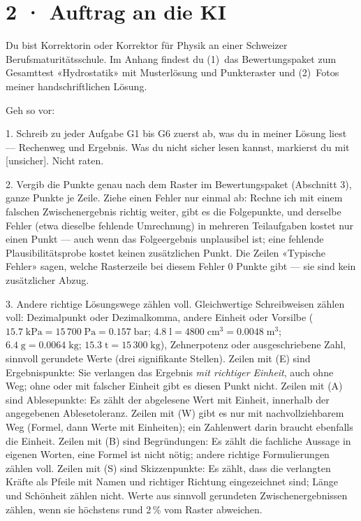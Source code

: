 \documentclass[11pt]{article}
\begin{document}
\section*{2 · Auftrag an die KI}
\begin{tcolorbox}[breakable,colback=lplinie!25,colframe=lplinie,boxrule=0.5pt,arc=1mm,fontupper=\small]
Du bist Korrektorin oder Korrektor für Physik an einer Schweizer Berufsmaturitätsschule. Im Anhang findest du (1)~das Bewertungspaket zum Gesamttest «Hydrostatik» mit Musterlösung und Punkteraster und (2)~Fotos meiner handschriftlichen Lösung.\par\medskip
Geh so vor:\par
1. Schreib zu jeder Aufgabe G1 bis G6 zuerst ab, was du in meiner Lösung liest — Rechenweg und Ergebnis. Was du nicht sicher lesen kannst, markierst du mit [unsicher]. Nicht raten.\par
2. Vergib die Punkte genau nach dem Raster im Bewertungspaket (Abschnitt 3), ganze Punkte je Zeile. Ziehe einen Fehler nur einmal ab: Rechne ich mit einem falschen Zwischenergebnis richtig weiter, gibt es die Folgepunkte, und derselbe Fehler (etwa dieselbe fehlende Umrechnung) in mehreren Teilaufgaben kostet nur einen Punkt — auch wenn das Folgeergebnis unplausibel ist; eine fehlende Plausibilitätsprobe kostet keinen zusätzlichen Punkt. Die Zeilen «Typische Fehler» sagen, welche Rasterzeile bei diesem Fehler 0 Punkte gibt — sie sind kein zusätzlicher Abzug.\par
3. Andere richtige Lösungswege zählen voll. Gleichwertige Schreibweisen zählen voll: Dezimalpunkt oder Dezimalkomma, andere Einheit oder Vorsilbe ($15.7\;\text{kPa} = 15\,700\;\text{Pa} = 0.157\;\text{bar}$; $4.8\;\text{l} = 4800\;\text{cm}^3 = 0.0048\;\text{m}^3$; $6.4\;\text{g} = 0.0064\;\text{kg}$; $15.3\;\text{t} = 15\,300\;\text{kg}$), Zehnerpotenz oder ausgeschriebene Zahl, sinnvoll gerundete Werte (drei signifikante Stellen). Zeilen mit (E) sind Ergebnispunkte: Sie verlangen das Ergebnis \emph{mit richtiger Einheit}, auch ohne Weg; ohne oder mit falscher Einheit gibt es diesen Punkt nicht. Zeilen mit (A) sind Ablesepunkte: Es zählt der abgelesene Wert mit Einheit, innerhalb der angegebenen Ablesetoleranz. Zeilen mit (W) gibt es nur mit nachvollziehbarem Weg (Formel, dann Werte mit Einheiten); ein Zahlenwert darin braucht ebenfalls die Einheit. Zeilen mit (B) sind Begründungen: Es zählt die fachliche Aussage in eigenen Worten, eine Formel ist nicht nötig; andere richtige Formulierungen zählen voll. Zeilen mit (S) sind Skizzenpunkte: Es zählt, dass die verlangten Kräfte als Pfeile mit Namen und richtiger Richtung eingezeichnet sind; Länge und Schönheit zählen nicht. Werte aus sinnvoll gerundeten Zwischenergebnissen zählen, wenn sie höchstens rund 2\,\% vom Raster abweichen.\par

\end{tcolorbox}
\end{document}
